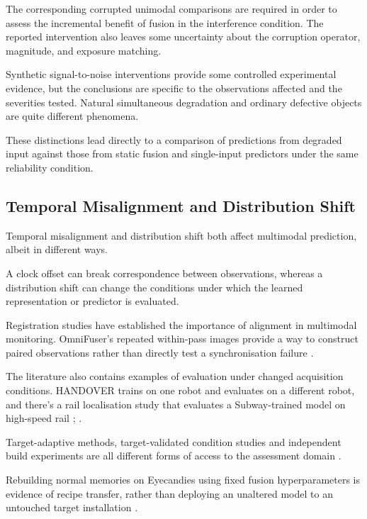 The corresponding corrupted unimodal comparisons are required in order to assess the incremental
benefit of fusion in the interference condition. The reported intervention also leaves some
uncertainty about the corruption operator, magnitude, and exposure matching.

Synthetic signal-to-noise interventions provide some controlled experimental evidence, but the
conclusions are specific to the observations affected and the severities tested. Natural
simultaneous degradation and ordinary defective objects are quite different phenomena.

These distinctions lead directly to a comparison of predictions from degraded input against those
from static fusion and single-input predictors under the same reliability condition.

\subsection{Temporal Misalignment and Distribution Shift}

Temporal misalignment and distribution shift both affect multimodal prediction, albeit in different
ways.

A clock offset can break correspondence between observations, whereas a distribution shift can
change the conditions under which the learned representation or predictor is evaluated.

Registration studies have established the importance of alignment in multimodal monitoring.
OmniFuser's repeated within-pass images provide a way to construct paired observations rather than
directly test a synchronisation failure \parencite{Petrich2021Multimodal,Chen2023Multisensor,P021}.

The literature also contains examples of evaluation under changed acquisition conditions. HANDOVER
trains on one robot and evaluates on a different robot, and there's a rail localisation study that
evaluates a Subway-trained model on high-speed rail \parencite[PDF p.~7, Table~V]{Thoduka2024Handover};
\parencite[PDF p.~10, Table~III]{P031}.

Target-adaptive methods, target-validated condition studies and independent build experiments are
all different forms of access to the assessment domain
\parencite{Wang2025A,Chu2024A,Huang2026Rolling,Bevans2023Heterogeneous}.

Rebuilding normal memories on Eyecandies using fixed fusion hyperparameters is evidence of recipe
transfer, rather than deploying an unaltered model to an untouched target installation
\parencite{P026,P033}.

